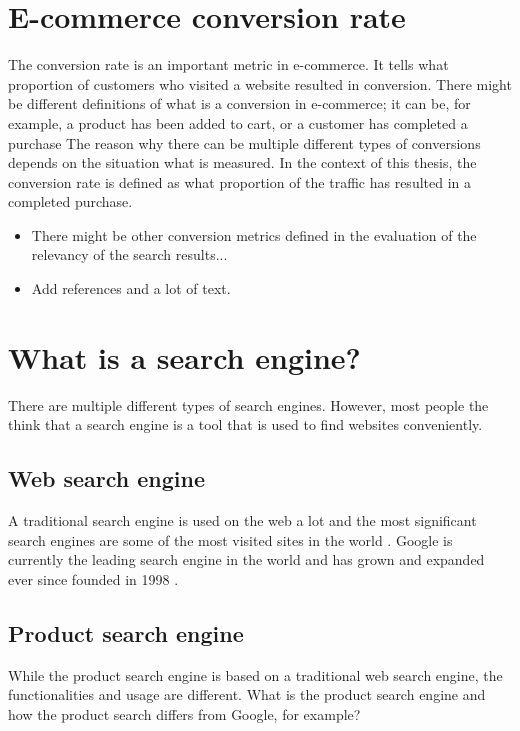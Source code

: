 \section{E-commerce conversion rate}
The conversion rate is an important metric in e-commerce. 
It tells what proportion of customers who visited a website resulted in conversion. 
There might be different definitions of what is a conversion in e-commerce; 
it can be, for example, a product has been added to cart, or a customer has completed a purchase
The reason why there can be multiple different types of conversions depends on the situation what is measured.
In the context of this thesis, the conversion rate is defined as what proportion of the traffic has resulted in a completed purchase.

\todo{}
\begin{itemize}

    \item There might be other conversion metrics defined in the evaluation of the relevancy of the search results...
    
    \item Add references and a lot of text.
    
\end{itemize}


\section{What is a search engine?}
There are multiple different types of search engines. However, most people the think that a search engine is a tool that is used to find websites conveniently.



\subsection{Web search engine}
A traditional search engine is used on the web a lot and the most significant search engines are some of the most visited sites in the world \cite{alexa}.
Google is currently the leading search engine in the world and has grown and expanded ever since founded in 1998 \cite{googleInit}.



\subsection{Product search engine}
While the product search engine is based on a traditional web search engine, the functionalities and usage are different. 
What is the product search engine and how the product search differs from Google, for example?




